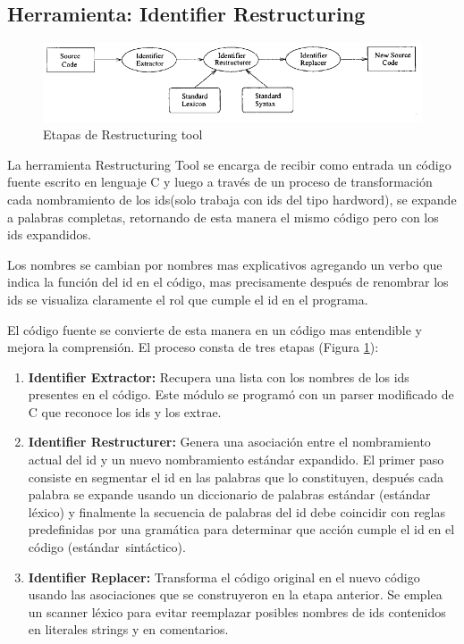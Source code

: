 \documentclass[a4paper,12pt]{report}
\begin{document}
\pagebreak 
\subsection{Herramienta: Identifier Restructuring}

\begin{figure}[h] %
\centering
\includegraphics[scale= 0.80]{./ire_1.png}
\caption{Etapas de Restructuring tool}
\label{ire1}
\end{figure}

La herramienta Restructuring Tool\cite{BCPT00} se encarga de recibir como entrada un código fuente escrito en lenguaje C y luego a través de un proceso de transformación cada nombramiento de los ids(solo trabaja con ids del tipo hardword), se expande a palabras completas, retornando de esta manera el mismo código pero con los ids expandidos.

Los nombres se cambian por nombres mas explicativos agregando un verbo que indica la función del id en el código, mas precisamente después de renombrar los ids se visualiza claramente el rol que cumple el id en el programa.

El código fuente se convierte de esta manera en un código mas entendible y mejora la comprensión. El proceso consta de tres etapas (Figura \ref{ire1}): 

\begin{enumerate}
\itemsep0em%
\item \textbf{Identifier Extractor:} Recupera una lista con los nombres de los ids presentes en el código. Este módulo se programó con un parser modificado de C que reconoce los ids y los extrae.
\item \textbf{Identifier Restructurer:} Genera una asociación entre el nombramiento actual del id y un nuevo nombramiento estándar expandido. El primer paso consiste en segmentar el id en las palabras que lo constituyen, después cada palabra se expande usando un diccionario de palabras estándar (estándar léxico) y finalmente la secuencia de palabras del id debe coincidir con reglas predefinidas por una gramática para determinar que acción cumple el id en el código \mbox{(estándar sintáctico).}
\item \textbf{Identifier Replacer:} Transforma el código original en el nuevo código usando las asociaciones que se construyeron en la etapa anterior. Se emplea un scanner léxico para evitar reemplazar posibles nombres de ids contenidos en literales strings y en comentarios.
\end{enumerate}
\end{document}
